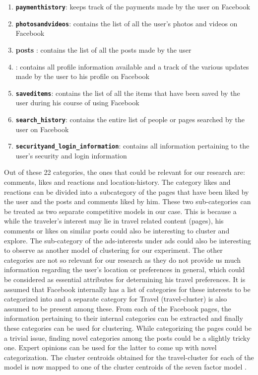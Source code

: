 \begin{enumerate}[i]
   \item \textbf{\texttt{payment\textunderscore history}}: keeps track of the payments made by the user on Facebook
   \item \textbf{\texttt{photos\textunderscore and\textunderscore videos}}: contains the list of all the user's photos and videos on Facebook
   \item \textbf{posts} : contains the list of all the posts made by the user
   \item \textbf{}: contains all profile information available and a track of the various updates made by the user to his profile on Facebook
   \item \textbf{\texttt{saved\textunderscore items}}: contains the list of all the items that have been saved by the user during his course of using Facebook
   \item \textbf{\texttt{search{\_}history}}: contains the entire list of people or pages searched by the user on Facebook
   \item \textbf{\texttt{security\textunderscore and{\_}login{\_}information}}: contains all information pertaining to the user's security and login information
  
\end{enumerate}

Out of these 22 categories, the ones that could be relevant for our research are: comments, likes and reactions and location-history. 
The category likes and reactions can be divided into a subcategory of the pages that have been liked by the user and the posts and comments liked by him. These two sub-categories can be treated as two separate competitive models in our case. This is because a while the traveler's interest may lie in travel related content (pages), his comments or likes on similar posts could also be interesting to cluster and explore. The sub-category of the ads-interests under ads could also be interesting to observe as another model of clustering for our experiment. The other categories are not so relevant for our research as they do not provide us much information regarding the user's location or preferences in general, which could be considered as essential attributes for determining his travel preferences. It is assumed that Facebook internally has a list of categories for these interests to be categorized into and a separate category for Travel (travel-cluster) is also assumed to be present among these. From each of the Facebook pages, the information pertaining to their internal categories can be extracted and finally these categories can be used for clustering. While categorizing the pages could be a trivial issue, finding novel categories among the posts could be a slightly tricky one. Expert opinions can be used for the latter to come up with novel categorization. The cluster centroids obtained for the travel-cluster for each of the model is now mapped to one of the cluster centroids of the seven factor model \cite{sertkan2018mapping}. 


